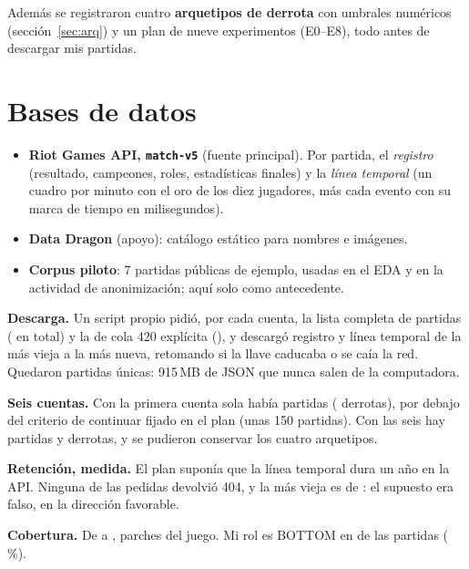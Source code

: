 \documentclass[11pt,letterpaper]{article}
\begin{document}
\noindent Además se registraron cuatro \textbf{arquetipos de derrota} con umbrales
numéricos (sección~\ref{sec:arq}) y un plan de nueve experimentos (E0--E8), todo antes
de descargar mis partidas.

\section{Bases de datos}

\begin{itemize}[leftmargin=1.4em,itemsep=.3em]
  \item \textbf{Riot Games API, \texttt{match-v5}} (fuente principal). Por partida, el
        \emph{registro} (resultado, campeones, roles, estadísticas finales) y la
        \emph{línea temporal} (un cuadro por minuto con el oro de los diez jugadores,
        más cada evento con su marca de tiempo en milisegundos).
  \item \textbf{Data Dragon} (apoyo): catálogo estático para nombres e imágenes.
  \item \textbf{Corpus piloto}: 7 partidas públicas de ejemplo, usadas en el EDA y en
        la actividad de anonimización; aquí solo como antecedente.
\end{itemize}

\noindent\textbf{Descarga.} Un script propio pidió, por cada cuenta, la lista completa
de partidas (\listaTotal{} en total) y la de cola 420 explícita (\listaCola), y
descargó registro y línea temporal de la más vieja a la más nueva, retomando si la
llave caducaba o se caía la red. Quedaron \nUnicas{} partidas únicas: 915\,MB de JSON
que nunca salen de la computadora.

\noindent\textbf{Seis cuentas.} Con la primera cuenta sola había \nCuentaUno{} partidas
(\derCuentaUno{} derrotas), por debajo del criterio de continuar fijado en el plan
(unas 150 partidas). Con las seis hay \nFinal{} partidas y \nDerrotas{} derrotas, y se
pudieron conservar los cuatro arquetipos.



\noindent\textbf{Retención, medida.} El plan suponía que la línea temporal dura un año
en la API. Ninguna de las \nUnicas{} pedidas devolvió 404, y la más vieja es de
\mesInicio: el supuesto era falso, en la dirección favorable.

\noindent\textbf{Cobertura.} De \mesInicio{} a \mesFin, \nParches{} parches del juego.
Mi rol es BOTTOM en \nBottom{} de las \nFinal{} partidas (\pctBottom\,\%).
\end{document}
